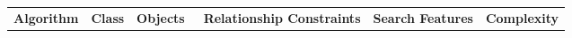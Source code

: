 {    %

\setlength\tabcolsep{0pt}
\small{
\begin{table*}[t]
    \begin{center}
        \begin{tabular}{|c|cc|cccc|ccc|c|} 

        

            \hline
            \multicolumn{1}{|c|}{\multirow{2}{*}{\textbf{Algorithm}}}& 
            \multicolumn{1}{|c}{\multirow{2}{*}{\textbf{Class}}} &
            \multicolumn{1}{c|}{\multirow{2}{*}{\textbf{Objects}~}} &
            \multicolumn{4}{|c|}{\multirow{2}{*}{\textbf{Relationship Constraints}}} &
            \multicolumn{3}{|c|}{\multirow{2}{*}{\textbf{Search Features}}} &
            \multicolumn{1}{|c|}{\multirow{2}{*}{\textbf{Complexity}}}\\
            &&&&&&&&&&\\
        



\end{tabular}
\end{center}
\end{table*}}}
